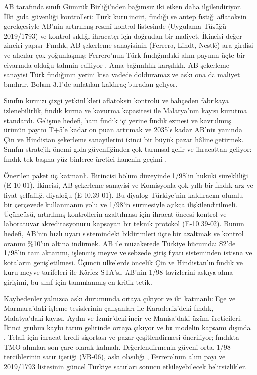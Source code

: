 AB tarafında sınıfı Gümrük Birliği'nden bağımsız iki etken daha ilgilendiriyor. İlki gıda güvenliği kontrolleri: Türk kuru inciri, fındığı ve antep fıstığı aflatoksin gerekçesiyle AB'nin artırılmış resmî kontrol listesinde (Uygulama Tüzüğü 2019/1793) ve kontrol sıklığı ihracatçı için doğrudan bir maliyet. İkincisi değer zinciri yapısı. Fındık, AB şekerleme sanayisinin (Ferrero, Lindt, Nestlé) ara girdisi ve alıcılar çok yoğunlaşmış; Ferrero'nun Türk fındığındaki alım payının üçte bir civarında olduğu tahmin ediliyor \etiketD{}. Ama bağımlılık karşılıklı. AB şekerleme sanayisi Türk fındığının yerini kısa vadede dolduramaz ve askı ona da maliyet bindirir. Bölüm 3.1'de anlatılan kaldıraç buradan geliyor.

Sınıfın kırmızı çizgi yetkinlikleri aflatoksin kontrolü ve bahçeden fabrikaya izlenebilirlik, fındık kırma ve kavurma kapasitesi ile Malatya'nın kayısı kurutma standardı. Gelişme hedefi, ham fındık içi yerine fındık ezmesi ve kavrulmuş ürünün payını T+5'e kadar on puan artırmak ve 2035'e kadar AB'nin yanında Çin ve Hindistan şekerleme sanayilerini ikinci bir büyük pazar hâline getirmek. Sınıfın stratejik önemi gıda güvenliğinden çok tarımsal gelir ve ihracattan geliyor: fındık tek başına yüz binlerce üretici hanenin geçimi \etiketD{}.

Önerilen paket üç katmanlı. Birincisi bölüm düzeyinde 1/98'in hukuki sürekliliği (E-10-01). İkincisi, AB şekerleme sanayisi ve Komisyonla çok yıllı bir fındık arz ve fiyat şeffaflığı diyaloğu (E-10.39-01). Bu diyalog Türkiye'nin kaldıracını olumlu bir çerçevede kullanmanın yolu ve 1/98'in sürmesiyle açıkça ilişkilendirilmeli. Üçüncüsü, artırılmış kontrollerin azaltılması için ihracat öncesi kontrol ve laboratuvar akreditasyonunu kapsayan bir teknik protokol (E-10.39-02). Bunun hedefi, AB'nin hızlı uyarı sistemindeki bildirimleri üçte bir azaltmak ve kontrol oranını \%10'un altına indirmek. AB ile müzakerede Türkiye hücumda: S2'de 1/98'in tam aktarımı, işlenmiş meyve ve sebzede giriş fiyatı sisteminden istisna ve kotaların genişletilmesi. Üçüncü ülkelerde öncelik Çin ve Hindistan'ın fındık ve kuru meyve tarifeleri \etiketD{} ile Körfez STA'sı. AB'nin 1/98 tavizlerini askıya alma girişimi, bu sınıf için tanımlanmış en kritik tetik.

Kaybedenler yalnızca askı durumunda ortaya çıkıyor ve iki katmanlı: Ege ve Marmara'daki işleme tesislerinin çalışanları ile Karadeniz'deki fındık, Malatya'daki kayısı, Aydın ve İzmir'deki incir ve Manisa'daki üzüm üreticileri. İkinci grubun kaybı tarım gelirinde ortaya çıkıyor ve bu modelin kapsamı dışında \etiketH{}. Telafi için ihracat kredi sigortası ve pazar çeşitlendirmesi öneriliyor; fındıkta TMO alımları son çare olarak kalmalı. Değerlendirmenin güveni orta. 1/98 tercihlerinin satır içeriği (VB-06), askı olasılığı \etiketH{}, Ferrero'nun alım payı ve 2019/1793 listesinin güncel Türkiye satırları \etiketD{} sonucu etkileyebilecek belirsizlikler.

